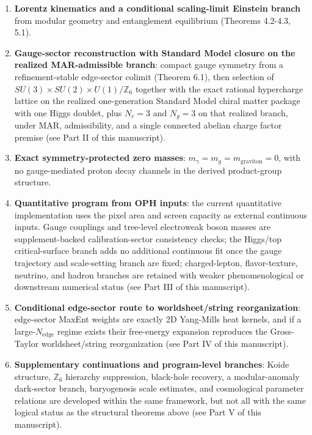 \begin{enumerate}
\def\labelenumi{\arabic{enumi}.}
\tightlist
\item
  \textbf{Lorentz kinematics and a conditional scaling-limit Einstein branch} from modular geometry and entanglement equilibrium (Theorems 4.2-4.3, 5.1).
\item
  \textbf{Gauge-sector reconstruction with Standard Model closure on the realized MAR-admissible branch}: compact gauge symmetry from a refinement-stable edge-sector colimit (Theorem 6.1), then selection of \(SU(3)\times SU(2)\times U(1)/\mathbb{Z}_6\) together with the exact rational hypercharge lattice on the realized one-generation Standard Model chiral matter package with one Higgs doublet, plus \(N_c=3\) and \(N_g=3\) on that realized branch, under MAR, admissibility, and a single connected abelian charge factor premise (see Part II of this manuscript).
\item
  \textbf{Exact symmetry-protected zero masses}: \(m_\gamma = m_g = m_{\text{graviton}} = 0\), with no gauge-mediated proton decay channels in the derived product-group structure.
\item
  \textbf{Quantitative program from OPH inputs}: the current quantitative implementation uses the pixel area and screen capacity as external continuous inputs. Gauge couplings and tree-level electroweak boson masses are supplement-backed calibration-sector consistency checks; the Higgs/top critical-surface branch adds no additional continuous fit once the gauge trajectory and scale-setting branch are fixed; charged-lepton, flavor-texture, neutrino, and hadron branches are retained with weaker phenomenological or downstream numerical status (see Part III of this manuscript).
\item
  \textbf{Conditional edge-sector route to worldsheet/string reorganization}: edge-sector MaxEnt weights are exactly 2D Yang-Mills heat kernels, and if a large-\(N_{\mathrm{edge}}\) regime exists their free-energy expansion reproduces the Gross-Taylor worldsheet/string reorganization (see Part IV of this manuscript).
\item
  \textbf{Supplementary continuations and program-level branches}: Koide structure, \(\mathbb{Z}_6\) hierarchy suppression, black-hole recovery, a modular-anomaly dark-sector branch, baryogenesis scale estimates, and cosmological parameter relations are developed within the same framework, but not all with the same logical status as the structural theorems above (see Part V of this manuscript).
\end{enumerate}

